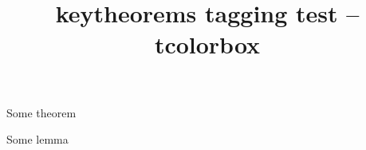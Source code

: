 \documentclass{article}
\title{keytheorems tagging test -- tcolorbox}
\begin{document}
\begin{theorem}
Some theorem
\end{theorem}

\begin{lemma}
Some lemma
\end{lemma}
\end{document}
